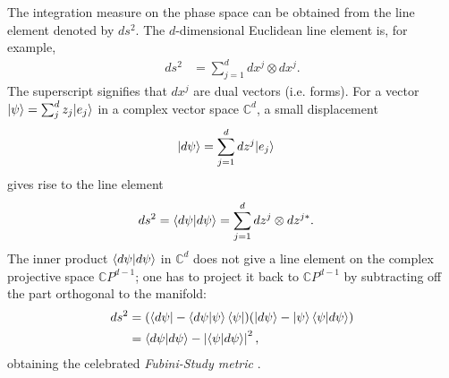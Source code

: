 The integration measure on the phase space can be obtained from the line element denoted by $ds^2$. The $d$-dimensional Euclidean line element is, for example,
\begin{align}
	ds^2 &= \sum_{j=1}^d dx^j \otimes dx^j.
\end{align}
The superscript signifies that $dx^j$ are dual vectors (i.e. forms).
For a vector ${\left\vert{\psi}\right\rangle} = \sum_j^dz_j {\left\vert{e_j}\right\rangle}$ in a complex vector space $\mathbb{C}^d$, a small displacement
\begin{align}
	{\left\vert{d\psi}\right\rangle} &= \sum_{j=1}^d dz^j {\left\vert{e_j}\right\rangle}
\end{align}
gives rise to the line element
\begin{align}
	ds^2 &= \braket{d\psi|d\psi} = \sum_{j=1}^d dz^j \otimes dz^{j*}.
\end{align}
The inner product $\braket{d\psi|d\psi}$ in $\mathbb{C}^d$ does not give a line element on the complex projective space $\mathbb{C}P^{d-1}$; one has to project it back to $\mathbb{C}P^{d-1}$ by subtracting off the part orthogonal to the manifold:
\begin{align}
ds^2 &= ({\left\langle{d\psi}\right\vert} - \braket{d\psi | \psi} {\left\langle{\psi}\right\vert} )( {\left\vert{d\psi}\right\rangle} - {\left\vert{\psi}\right\rangle} \braket{\psi | d\psi} ) \\
&= \braket{d\psi | d\psi} -  \left| \braket{\psi | d\psi} \right|^2,
\end{align}
obtaining the celebrated \emph{Fubini-Study metric} \cite{caves2001measures}.

